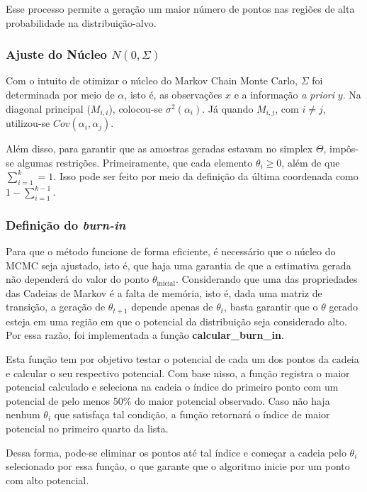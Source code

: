 \documentclass{article}
\begin{document}
Esse processo permite a geração um maior número de pontos nas regiões de alta probabilidade na distribuição-alvo.
 
\subsubsection{Ajuste do Núcleo $N(0, \Sigma)$}
Com o intuito de otimizar o núcleo do Markov Chain Monte Carlo, $\Sigma$ foi determinada por meio de $\alpha$, isto é, as observações $x$ e a informação \textit{a priori} $y$. Na diagonal principal ($M_{i, i}$), colocou-se $\sigma^{2}(\alpha_i)$. Já quando $M_{i, j}$, com $i \not= j$, utilizou-se $Cov(\alpha_i, \alpha_j)$.

Além disso, para garantir que as amostras geradas estavam no simplex $\Theta$, impôs-se algumas restrições. Primeiramente, que cada elemento $\theta_i \geq 0$, além de que $\sum_{i = 1}^{k} = 1$. Isso pode ser feito por meio da definição da última coordenada como $1 - \sum_{i = 1}^{k - 1}$.

\subsubsection{Definição do \textit{burn-in}}


Para que o método funcione de forma eficiente, é necessário que o núcleo do MCMC seja ajustado, isto é, que haja uma garantia de que a estimativa gerada não dependerá do valor do ponto \(\theta_{\text{inicial}}\). Considerando que uma das propriedades das Cadeias de Markov é a falta de memória, isto é, dada uma matriz de transição, a geração de \(\theta_{t+1}\) depende apenas de \(\theta_{t}\), basta garantir que o \(\theta\) gerado esteja em uma região em que o potencial da distribuição seja considerado alto. Por essa razão, foi implementada a função \textbf{calcular\_burn\_in}.

Esta função tem por objetivo testar o potencial de cada um dos pontos da cadeia e calcular o seu respectivo potencial. Com base nisso, a função registra o maior potencial calculado e seleciona na cadeia o índice do primeiro ponto com um potencial de pelo menos 50\% do maior potencial observado. Caso não haja nenhum \(\theta_i\) que satisfaça tal condição, a função retornará o índice de maior potencial no primeiro quarto da lista.

Dessa forma, pode-se eliminar os pontos até tal índice e começar a cadeia pelo \(\theta_i\) selecionado por essa função, o que garante que o algoritmo inicie por um ponto com alto potencial.
\end{document}
